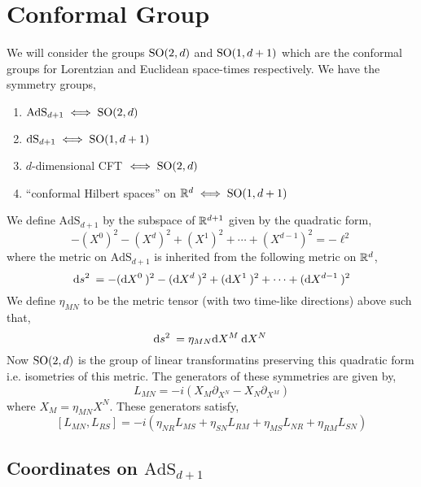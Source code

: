 \documentclass[12pt]{extarticle}
\newcommand{\dS}[1]{\mathrm{dS}_{#1}}
\newcommand{\AdS}[1]{\mathrm{AdS}_{#1}}
\begin{document}
\section{Conformal Group}

We will consider the groups $\mathrm{SO}(2, d)$ and $\mathrm{SO}(1, d+1)$ which are the conformal groups for Lorentzian and Euclidean space-times respectively. We have the symmetry groups,
\begin{enumerate}
\item $\AdS{d+1} \iff \SO{2}{d}$
\item $\dS{d+1} \iff \SO{1}{d+1}$
\item $d$-dimensional CFT $\iff \mathrm{SO}(2, d)$
\item ``conformal Hilbert spaces'' on $\mathbb{R}^d \iff \mathrm{SO}(1, d+1)$
\end{enumerate} 
We define $\AdS{d+1}$ by the subspace of $\mathbb{R}^{d+1}$ given by the quadratic form,
\[ -(X^0)^2 - (X^{d})^2 + (X^1)^2 + \cdots + (X^{d-1})^2 = - \ell^2 \]
where the metric on $\AdS{d+1}$ is inherited from the following metric on $\mathbb{R}^d$,
\[ \mathrm{d}s^2 \: = - (\mathrm{d}X^0 \:)^2 - (\mathrm{d}X^d \:)^2 + (\mathrm{d}X^1 \:)^2 + \cdots + (\mathrm{d}X^{d-1} \:)^2 \]
We define $\eta_{MN}$ to be the metric tensor (with two time-like directions) above such that,
\[ \mathrm{d}s^2 \: = \eta_{MN} \mathrm{d}X^M \: \mathrm{d}X^N \: \]
Now $\mathrm{SO}(2, d)$ is the group of linear transformatins preserving this quadratic form i.e. isometries of this metric. The generators of these symmetries are given by,
\[ L_{MN} = - i (X_M \partial_{X^N} - X_N \partial_{X^M}) \]
where $X_M = \eta_{MN} X^N$. These generators satisfy,
\[ [L_{MN}, L_{RS}] = -i \left( \eta_{NR} L_{MS} + \eta_{SN} L_{RM} + \eta_{MS} L_{NR} + \eta_{RM} L_{SN} \right) \]
 
\subsection{Coordinates on $\AdS{d+1}$}
\end{document}
